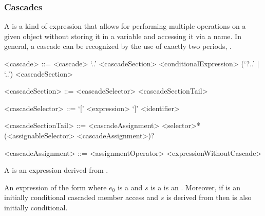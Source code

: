 \documentclass[makeidx]{article}
\begin{document}
{\subsubsection{Cascades}

\LMHash{}%
A  is a kind of expression that allows for performing
multiple operations on a given object
without storing it in a variable and accessing it via a name.
In general, a cascade can be recognized by the use of exactly two periods,
.

\begin{grammar}
<cascade> ::= <cascade> `..' <cascadeSection>
  \alt <conditionalExpression> (`?..' | `..') <cascadeSection>

<cascadeSection> ::= <cascadeSelector> <cascadeSectionTail>

<cascadeSelector> ::= `[' <expression> `]'
  \alt <identifier>

<cascadeSectionTail> ::= <cascadeAssignment>
  \alt <selector>* (<assignableSelector> <cascadeAssignment>)?

<cascadeAssignment> ::= <assignmentOperator> <expressionWithoutCascade>
\end{grammar}

\LMHash{}%
A 
is an expression derived from .




\LMHash{}%
An expression of the form  where
$e_0$ is a  and
$s$ is a  is an
.
Moreover, if  is
an initially conditional cascaded member access and
$s$ is derived from  then
 is also initially conditional.

}
\end{document}
